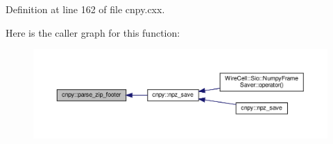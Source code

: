 Definition at line 162 of file cnpy.\+cxx.

Here is the caller graph for this function\+:
\nopagebreak
\begin{figure}[H]
\begin{center}
\leavevmode
\includegraphics[width=350pt]{namespacecnpy_a0feec097a7dbb48c449bc7e9b27b7fd6_icgraph}
\end{center}
\end{figure}
